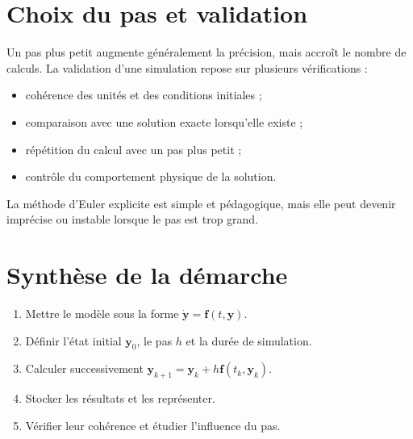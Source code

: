 \section{Choix du pas et validation}
Un pas plus petit augmente généralement la précision, mais accroît le nombre de calculs. La validation d'une simulation repose sur plusieurs vérifications :
\begin{itemize}
\item cohérence des unités et des conditions initiales ;
\item comparaison avec une solution exacte lorsqu'elle existe ;
\item répétition du calcul avec un pas plus petit ;
\item contrôle du comportement physique de la solution.
\end{itemize}

La méthode d'Euler explicite est simple et pédagogique, mais elle peut devenir imprécise ou instable lorsque le pas est trop grand.

\section{Synthèse de la démarche}
\begin{enumerate}
\item Mettre le modèle sous la forme $\dot{\mathbf y}=\mathbf f(t,\mathbf y)$.
\item Définir l'état initial $\mathbf y_0$, le pas $h$ et la durée de simulation.
\item Calculer successivement $\mathbf y_{k+1}=\mathbf y_k+h\mathbf f(t_k,\mathbf y_k)$.
\item Stocker les résultats et les représenter.
\item Vérifier leur cohérence et étudier l'influence du pas.
\end{enumerate}
